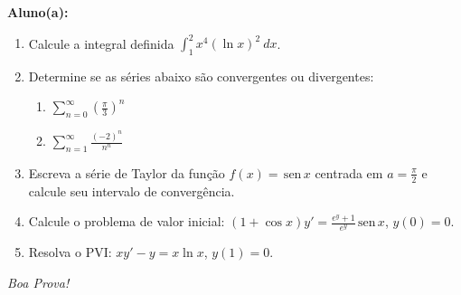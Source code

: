 \documentclass[a4paper,5pt]{amsbook}
\newcommand{\sen}{\,\mbox{sen}\,}
\newcommand{\tg}{\,\mbox{tg}\,}
\newcommand{\cosec}{\,\mbox{cosec}\,}
\newcommand{\cotg}{\,\mbox{cotg}\,}
\newcommand{\ds}{\displaystyle}
\begin{document}
\vspace{0.5cm}
{\bf Aluno(a):}\dotfill{}  %

\vspace{0.2cm}
\begin{enumerate}
	\vspace{0.5cm}
	\item Calcule a integral definida $\ds \int_1^2 x^4{(\ln{x})}^2\ dx$.

	\vspace{0.5cm}
	\item Determine se as s\'eries abaixo s\~ao convergentes ou divergentes:
		\begin{enumerate}
			\vspace{0.3cm}
			\item $\ds\sum_{n=0}^\infty \left(\frac{\pi}{3}\right)^n$
			\vspace{0.3cm}
			\item $\ds\sum_{n=1}^\infty \frac{(-2)^n}{n^n}$
		\end{enumerate}

	\vspace{0.5cm}
	\item Escreva a s\'erie de Taylor da fun\c{c}\~ao $f(x) = \sen{x}$ centrada em $a =
		\frac{\pi}{2}$ e calcule seu intervalo de converg\^encia.

	\vspace{0.5cm}
	\item Calcule o problema de valor inicial: $\ds (1+\cos{x}) y' = \frac{e^y+1}{e^y} \sen{x}$, $y(0) = 0$.

	\vspace{0.5cm}
	\item Resolva o PVI: $xy' - y = x \ln{x}$, $y(1) = 0$.
\end{enumerate}


\begin{flushright}
	\vspace{1cm}
	\textit{Boa Prova!}
\end{flushright}
\end{document}
